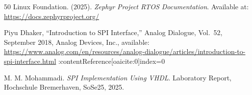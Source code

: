 \documentclass[11pt, a4paper]{report}
\begin{document}
\begin{thebibliography}{50}
Linux Foundation. (2025). \textit{Zephyr Project RTOS Documentation}. Available at: \url{https://docs.zephyrproject.org/}

Piyu Dhaker,
``Introduction to SPI Interface,''
Analog Dialogue, Vol.~52, September 2018,
Analog Devices, Inc.,
available: \url{https://www.analog.com/en/resources/analog-dialogue/articles/introduction-to-spi-interface.html} :contentReference[oaicite:0]{index=0}

M. M. Mohammadi. \textit{SPI Implementation Using VHDL}. Laboratory Report, Hochschule Bremerhaven, SoSe25, 2025.


\end{thebibliography}


\clearpage 
\appendix 

	
\end{document}
